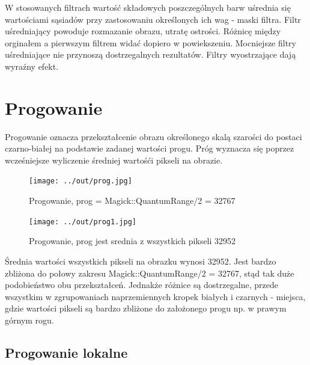 \documentclass[a4paper,12pt]{article}
\begin{document}
\newpage
W stosowanych filtrach wartość składowych poszczególnych barw uśrednia się wartościami sąsiadów przy zastosowaniu określonych ich wag - maski filtra.
Filtr uśredniający powoduje rozmazanie obrazu, utratę ostrości. Różnicę między orginałem a pierwszym filtrem widać dopiero w powiekszeniu. Mocniejsze filtry uśredniające nie przynoszą dostrzegalnych rezultatów.
Filtry wyostrzające dają wyraźny efekt.





\newpage
\section{Progowanie}

Progowanie oznacza przekształcenie obrazu określonego skalą szarości do postaci czarno-białej na podstawie zadanej wartości progu. Próg wyznacza się poprzez wcześniejsze wyliczenie średniej wartośći pikseli na obrazie.

\begin{figure}[h!]
\begin{minipage}[t]{7.5cm}
\begin{center}
\texttt{[image: ../out/prog.jpg]}
\caption{Progowanie, prog = Magick::QuantumRange/2 = 32767}
\end{center}
\end{minipage}
\hfill
\begin{minipage}[t]{7.5cm}
\begin{center}
\texttt{[image: ../out/prog1.jpg]}
\caption{Progowanie, prog jest srednia z wszystkich pikseli 32952}
\end{center}
\end{minipage}
\end{figure}

Średnia wartości wszystkich pikseli na obrazku wynosi 32952. Jest bardzo zbliżona do połowy zakresu Magick::QuantumRange/2 = 32767, stąd tak duże podobieństwo obu przekształceń. Jednakże różnice są dostrzegalne, przede wszystkim w zgrupowaniach naprzemiennych kropek białych i czarnych - miejsca, gdzie wartości pikseli są bardzo zbliżone do założonego progu np. w prawym górnym rogu. 



\subsection{Progowanie lokalne}
\end{document}
